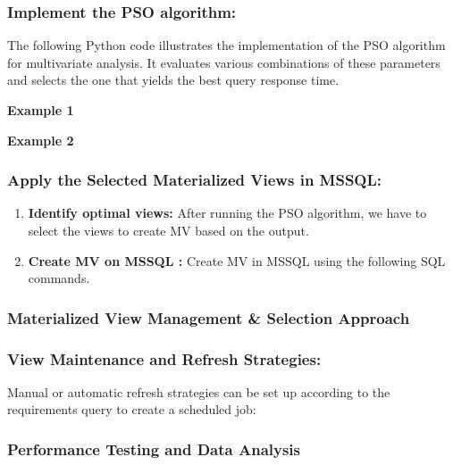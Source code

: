   

   


  
\subsubsection{Implement the PSO algorithm:}
 The following Python code illustrates the implementation of the PSO algorithm for multivariate analysis. It evaluates various combinations of these parameters and selects the one that yields the best query response time.\vspace{.4cm}

\textbf{Example 1}

  \vspace{.4cm}

\textbf{Example 2}
  \vspace{.4cm}
  
\subsubsection{Apply the Selected  Materialized Views in MSSQL:}

\begin{enumerate}
    \item \textbf{Identify optimal views:} After running the PSO algorithm, we have to select the views to create MV based on the output.
    \item \textbf{ Create MV on MSSQL :} Create MV in MSSQL using the following SQL commands.
    
   
    
\end{enumerate}


\subsubsection{Materialized View Management \& Selection Approach}
\subsubsection{View Maintenance and Refresh Strategies:} Manual or automatic refresh strategies can be set up according to the requirements query to create a scheduled job:



\subsubsection{Performance Testing and Data Analysis}


